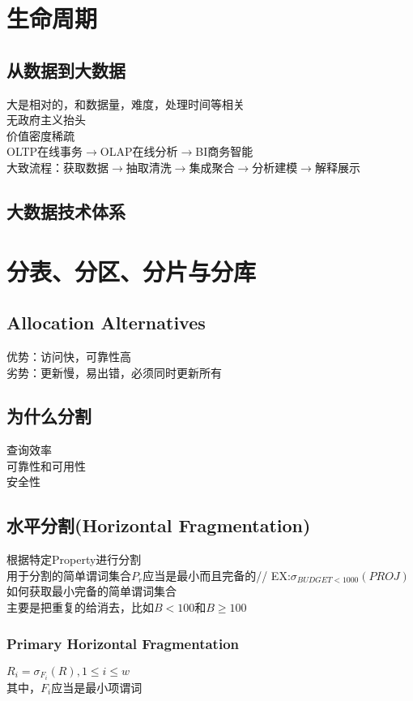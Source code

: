 \documentclass{article}
\begin{document}
\begin{CJK}{UTF8}{gbsn}
	
	\section*{生命周期}
	\subsection*{从数据到大数据}
	大是相对的，和数据量，难度，处理时间等相关\\
	无政府主义抬头\\
	价值密度稀疏\\
	OLTP在线事务$\rightarrow$OLAP在线分析$\rightarrow$BI商务智能\\
	大致流程：获取数据$\rightarrow$抽取清洗$\rightarrow$集成聚合$\rightarrow$分析建模$\rightarrow$解释展示\\
	\subsection*{大数据技术体系}
	
	
	
	\section*{分表、分区、分片与分库}
	\subsection*{Allocation Alternatives}
	优势：访问快，可靠性高\\
	劣势：更新慢，易出错，必须同时更新所有\\
	\subsection*{为什么分割}
	查询效率\\
	可靠性和可用性\\
	安全性\\
	\subsection*{水平分割(Horizontal Fragmentation)}
	根据特定Property进行分割\\
	用于分割的简单谓词集合$P_r$应当是最小而且完备的//
	EX:$\sigma_{BUDGET<1000}(PROJ)$\\
	如何获取最小完备的简单谓词集合\\
	主要是把重复的给消去，比如$B<100$和$B\geq 100$\\
	\subsubsection*{Primary Horizontal Fragmentation}
	$R_i=\sigma_{F_i}(R),1\leq i\leq w$\\
	其中，$F_i$应当是最小项谓词\\	

\end{CJK}
\end{document}
